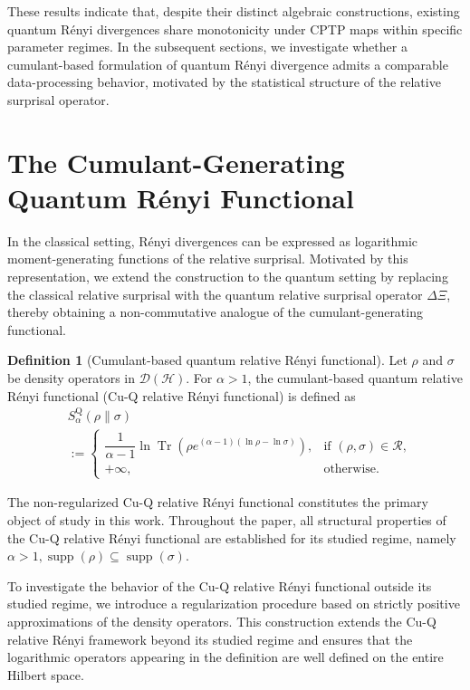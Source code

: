 \documentclass[a4paper, amsfonts, amssymb, amsmath, reprint, showkeys, nofootinbib, twoside, aps, pra]{revtex4-2}
\theoremstyle{definition}
\newtheorem{definition}{Definition}
\begin{document}
These results indicate that, despite their distinct algebraic constructions, existing quantum Rényi divergences share monotonicity under CPTP maps within specific parameter regimes. In the subsequent sections, we investigate whether a cumulant-based formulation of quantum Rényi divergence admits a comparable data-processing behavior, motivated by the statistical structure of the relative surprisal operator.
\section{The Cumulant-Generating Quantum Rényi Functional}

In the classical setting, Rényi divergences can be expressed as logarithmic moment-generating functions of the relative surprisal. Motivated by this representation, we extend the construction to the quantum setting by replacing the classical relative surprisal with the quantum relative surprisal operator $\Delta \Xi$, thereby obtaining a non-commutative analogue of the cumulant-generating functional.

\begin{definition}[Cumulant-based quantum relative Rényi functional] 
    Let $\rho$ and $\sigma$ be density operators in $\mathcal{D}(\mathcal{H})$. For $\alpha >1$, the cumulant-based quantum relative Rényi functional (Cu-Q relative Rényi functional) is defined as
    \begin{equation}
    \label{QCRRF}
    \begin{split}
        &S_\alpha^{\text{Q}}(\rho \| \sigma) \\
        &:= \begin{cases} 
            \dfrac{1}{\alpha - 1} \ln \operatorname{Tr} \left( \rho e^{(\alpha - 1) (\ln \rho - \ln \sigma)} \right), & \text{if } (\rho, \sigma) \in \mathcal{R}, \\ 
            +\infty, & \text{otherwise.} 
        \end{cases} 
    \end{split}
    \end{equation}
\end{definition}

The non-regularized Cu-Q relative Rényi functional constitutes the primary object of study in this work. Throughout the paper, all structural properties of the Cu-Q relative Rényi functional are established for its studied regime, namely $\alpha>1,\operatorname{supp}(\rho)\subseteq
\operatorname{supp}(\sigma)$.

To investigate the behavior of the Cu-Q relative Rényi functional outside its studied regime, we introduce a regularization procedure based on strictly
positive approximations of the density operators. This construction
extends the Cu-Q relative Rényi framework beyond its studied regime and
ensures that the logarithmic operators appearing in the definition are
well defined on the entire Hilbert space.
\end{document}

